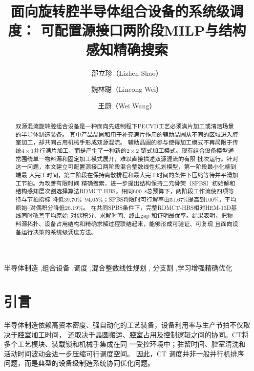 \documentclass[final,5p,times,twocolumn]{elsarticle}
\begin{document}
\begin{frontmatter}

\title{面向旋转腔半导体组合设备的系统级调度：
可配置源接口两阶段MILP与结构感知精确搜索}

\author[ustb]{邵立珍（Lizhen Shao）}
\author[ustb]{魏林聪（Lincong Wei）}
\author[ustb]{王蔚（Wei Wang）}

\address[ustb]{北京科技大学控制科学与工程系，北京市海淀区学院路30号，
北京100083，中国}

\begin{abstract}
双源混流旋转腔组合设备是一种面向先进制程下PECVD工艺必须满片加工或清洁场景的半导体制造装备。
其中产品晶圆和用于补充满片作用的辅助晶圆从不同的区域进入腔室加工，却共同占用机械手形成双源混流。
辅助晶圆的参与使得加工模式不再局限于传统$4\times1$并行满片加工，而是产生了一种新的$2\times2$
链式加工模式。现有组合设备模型通常围绕单一物料源和固定加工模式展开，难以直接描述双源混流的有限
批次运行。针对这一问题，本文建立可配置源接口两阶段混合整数线性规划模型，第一阶段最小化端到端最
大完工时间，第二阶段在保持离散排程和最大完工时间的条件下压缩等待并平滑加工节拍。为改善有限时间
精确搜索，进一步提出结构保持二元骨架（SPBS）初始解和结构感知层次割选择算法RDMCT-HBS。相同600~s总预算下，两阶段工作流使四项等待与节拍指标
降低39.70\%--94.05\%；SPBS将限时可行解率由51.67\%提高到100\%，平均原始--对偶积分降低26.19\%。
在共同SPBS条件下，完整RDMCT-HBS相对HEM-13D基线同时改善平均原始--对偶积分、求解时间、终止gap
和证明最优率。结果表明，把物料源拓扑、设备占用结构和精确求解过程联结起来，能够形成可验证、可复现
且面向设备运行决策的系统级调度方法。
\end{abstract}

\begin{keyword}
半导体制造 \sep 组合设备 \sep 调度 \sep 混合整数线性规划 \sep
分支割 \sep 学习增强精确优化
\end{keyword}

\end{frontmatter}
\section{引言}

半导体制造依赖高资本密度、强自动化的工艺装备，设备利用率与生产节拍不仅取决于腔室加工时间，
还取决于晶圆搬运、腔室占用及控制逻辑之间的协同。CT将多个工艺模块、装载锁和机械手集成在同
一受控环境中；驻留时间、腔室清洗和活动时间波动会进一步压缩可行调度空间\citep{pan2018survey}。
因此，CT 调度并非一般并行机排序问题，而是典型的设备级制造系统协同优化问题。
\end{document}
